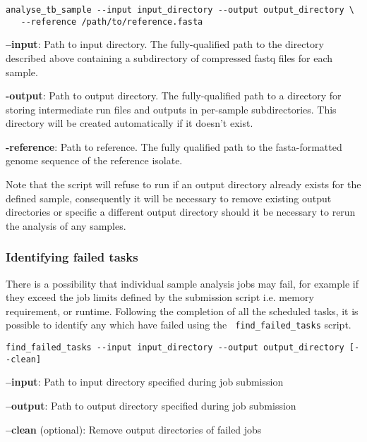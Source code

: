 \documentclass[a4paper,10pt,twoside]{article}
\newenvironment{tight_itemize}{
\begin{itemize}
  \setlength{\itemsep}{0pt}
  \setlength{\parskip}{0pt}
}{\end{itemize}}
\begin{document}
\begin{verbatim}
analyse_tb_sample --input input_directory --output output_directory \
   --reference /path/to/reference.fasta
\end{verbatim}

\begin{tight_itemize}
\item \textbf{--input}: Path to input directory. The fully-qualified path to
the directory described above containing a subdirectory of compressed fastq
files for each sample.
 \item \textbf{-output}: Path to output directory. The fully-qualified path to a
directory for storing intermediate run files and outputs in per-sample
subdirectories. This directory will be created automatically if it doesn't
exist. 
\item \textbf{-reference}: Path to reference. The fully qualified path to the
fasta-formatted genome sequence of the reference isolate.
\end{tight_itemize}

Note that the script will refuse to run if an output directory already exists
for the defined sample, consequently it will be necessary to remove existing
output directories or specific a different output directory should it be
necessary to rerun the analysis of any samples. 

\subsubsection{Identifying failed tasks}

There is a possibility that individual sample analysis jobs may fail, for
example if they exceed the job limits defined by the submission script i.e.
memory requirement, or runtime. Following the completion of all the scheduled
tasks, it is possible to identify any which have failed using the {\tt
find\_failed\_tasks} script.

\begin{verbatim}
find_failed_tasks --input input_directory --output output_directory [--clean]
\end{verbatim}

\begin{tight_itemize}
\item \textbf{--input}: Path to input directory specified during job submission
\item \textbf{--output}: Path to output directory specified during job submission
\item \textbf{--clean} (optional): Remove output directories of failed jobs
\end{tight_itemize}
\end{document}
